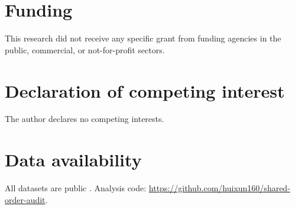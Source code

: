 \documentclass[preprint,11pt]{elsarticle}
\begin{document}
\section*{Funding}
This research did not receive any specific grant from funding agencies in the public, commercial, or not-for-profit sectors.

\section*{Declaration of competing interest}
The author declares no competing interests.

\section*{Data availability}
All datasets are public \citep{shin2018,huang2021,chen2023,mukli2021}. Analysis code: \url{https://github.com/huixun160/shared-order-audit}.



\end{document}
